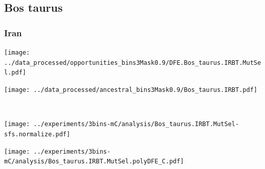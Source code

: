 \subsection{Bos taurus}

\subsubsection{Iran}

\begin{minipage}{0.49\linewidth}
    \texttt{[image: ../data\_processed/opportunities\_bins3Mask0.9/DFE.Bos\_taurus.IRBT.MutSel.pdf]}
\end{minipage}
\begin{minipage}{0.49\linewidth}
    \texttt{[image: ../data\_processed/ancestral\_bins3Mask0.9/Bos\_taurus.IRBT.pdf]}
\end{minipage}
\\
\begin{minipage}{0.49\linewidth}
    \texttt{[image: ../experiments/3bins-mC/analysis/Bos\_taurus.IRBT.MutSel-sfs.normalize.pdf]}
\end{minipage}
\begin{minipage}{0.4\linewidth}
    \texttt{[image: ../experiments/3bins-mC/analysis/Bos\_taurus.IRBT.MutSel.polyDFE\_C.pdf]}
\end{minipage}
